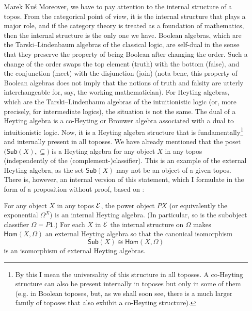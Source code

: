 \begin{artengenv}{Marek Ku\'s}
Moreover, we have to pay attention to the internal structure of a topos. From the categorical point of view, it is the internal structure that plays a major role, and if the category theory is treated as a foundation of mathematics, then the internal structure is the only one we have. Boolean algebras, which are the Tarski--Lindenbaum algebras of the classical logic, are self-dual in the sense that they preserve the property of being Boolean after changing the order. Such a change of the order swaps the top element (truth) with the bottom (false), and the conjunction (meet) with the disjunction (join) (nota bene, this property of Boolean algebras does not imply that the notions of truth and falsity are utterly interchangeable for, say, the working mathematician). For Heyting algebras, which are the Tarski--Lindenbaum algebras of the intuitionistic logic (or, more precisely, for intermediate logics), the situation is not the same. The dual of a Heyting algebra is a co-Heyting or Brouwer algebra associated with a dual to intuitionistic logic. Now, it is a Heyting algebra structure that is fundamentally\footnote{By this I mean the universality of this structure in all toposes. A co-Heyting structure can also be present internally in toposes but only in some of them (e.g. in Boolean toposes, but, as we shall soon see, there is a much larger family of toposes that also exhibit a co-Heyting structure).} and internally present in all toposes. We have already mentioned that the poset $ \big(\textsf{Sub}(X), \subseteq\!\big) $ is a Heyting algebra for any object $ X $ in any topos (independently of the (complement-)classifier). This is an example of the external Heyting algebra, as the set $ \textsf{Sub}(X) $ may not be an object of a given topos. There is, however, an internal version of this statement, which I formulate in the form of a proposition without proof, based on \parencite[p.201]{maclane-moerdijk-1994}:

\begin{proposition-stopa}
	For any object $ X $ in any topos $ \mathcal{E} $, the power object $ PX $ (or equivalently the exponential $ \Omega^X $) is an internal Heyting algebra. (In particular, so is the subobject classifier $ \Omega = P \textsf{1} $.) For each $ X $ in $ \mathcal{E} $ the internal structure on $ \Omega $ makes $ \textsf{Hom}(X,\Omega) $ an external Heyting algebra so that the canonical isomorphism
	\begin{equation}\label{iso}
	\textsf{Sub}(X)\cong\textsf{Hom}(X,\Omega)
	\end{equation}
	is an isomorphism of external Heyting algebras.
\end{proposition-stopa}



\end{artengenv}

